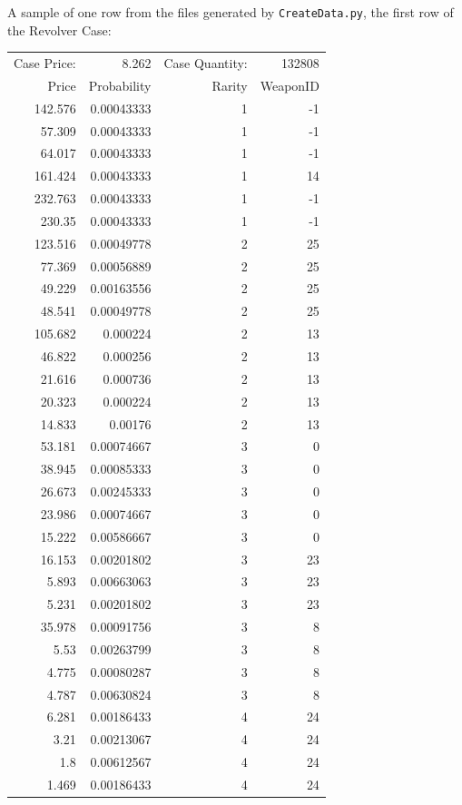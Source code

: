 \documentclass[12pt, letterpaper]{paper}
\begin{document}
A sample of one row from the files generated by \texttt{CreateData.py}, the
first row of the Revolver Case:


\begin{center}
\begin{tabular}{rrrr}
Case Price: & 8.262 & Case Quantity: & 132808\\
Price & Probability & Rarity & WeaponID\\
142.576 & 0.00043333 & 1 & -1\\
57.309 & 0.00043333 & 1 & -1\\
64.017 & 0.00043333 & 1 & -1\\
161.424 & 0.00043333 & 1 & 14\\
232.763 & 0.00043333 & 1 & -1\\
230.35 & 0.00043333 & 1 & -1\\
123.516 & 0.00049778 & 2 & 25\\
77.369 & 0.00056889 & 2 & 25\\
49.229 & 0.00163556 & 2 & 25\\
48.541 & 0.00049778 & 2 & 25\\
105.682 & 0.000224 & 2 & 13\\
46.822 & 0.000256 & 2 & 13\\
21.616 & 0.000736 & 2 & 13\\
20.323 & 0.000224 & 2 & 13\\
14.833 & 0.00176 & 2 & 13\\
53.181 & 0.00074667 & 3 & 0\\
38.945 & 0.00085333 & 3 & 0\\
26.673 & 0.00245333 & 3 & 0\\
23.986 & 0.00074667 & 3 & 0\\
15.222 & 0.00586667 & 3 & 0\\
16.153 & 0.00201802 & 3 & 23\\
5.893 & 0.00663063 & 3 & 23\\
5.231 & 0.00201802 & 3 & 23\\
35.978 & 0.00091756 & 3 & 8\\
5.53 & 0.00263799 & 3 & 8\\
4.775 & 0.00080287 & 3 & 8\\
4.787 & 0.00630824 & 3 & 8\\
6.281 & 0.00186433 & 4 & 24\\
3.21 & 0.00213067 & 4 & 24\\
1.8 & 0.00612567 & 4 & 24\\
1.469 & 0.00186433 & 4 & 24\\

\end{tabular}
\end{center}
\end{document}
